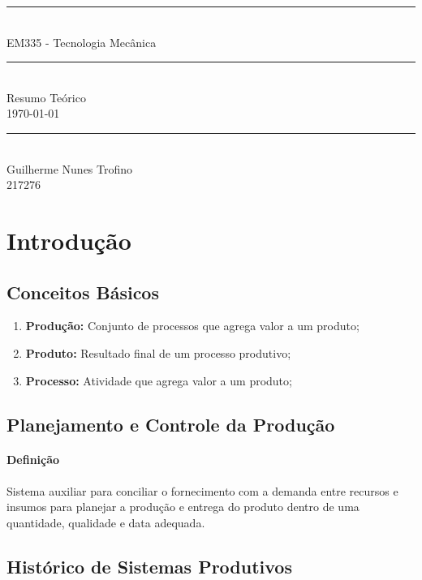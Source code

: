 \documentclass{article}
\begin{document}
    \begin{titlepage}
        \begin{center}
            \rule{450pt}{0.5pt}\\[4mm]
            {\Huge EM335 - Tecnologia Mecânica}\\
            \rule{450pt}{0.5pt}\\[2mm]
            {\Large Resumo Teórico}\\[200mm]
            \today\\
            \rule{250pt}{0.5pt}\\
            {\large Guilherme Nunes Trofino}\\
            {\large 217276}\\
        \end{center}
    \end{titlepage}
\newpage

    \tableofcontents
\newpage

    \section{Introdução}
        \subsection{Conceitos Básicos}
            \begin{enumerate}[noitemsep]
                \item \textbf{Produção:} Conjunto de processos que agrega valor a um produto;
                \item \textbf{Produto:} Resultado final de um processo produtivo;
                \item \textbf{Processo:} Atividade que agrega valor a um produto;
            \end{enumerate}

        \subsection{Planejamento e Controle da Produção}
            \paragraph{Definição}Sistema auxiliar para conciliar o fornecimento com a demanda entre recursos e insumos para planejar a produção e entrega do produto dentro de uma quantidade, qualidade e data adequada.

        \subsection{Histórico de Sistemas Produtivos}
\end{document}
